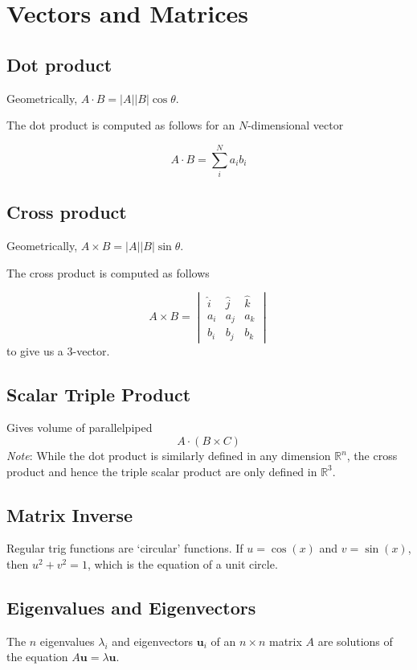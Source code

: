 
\section{Vectors and Matrices}

\subsection*{Dot product}

Geometrically, $A \cdot B = |A| |B| \cos \theta$.

The dot product is computed as follows for an $N$-dimensional vector

\begin{equation*}
  A \cdot B = \sum_{i}^{N} a_i b_i
\end{equation*}

\subsection*{Cross product}

Geometrically, $A \times B = |A| |B| \sin \theta$.

The cross product is computed as follows

\begin{equation*}
  A \times B = \begin{vmatrix} \hat{i} & \hat{j} & \hat{k} \\ a_i & a_j & a_k \\ b_i  & b_j & b_k\end{vmatrix}
\end{equation*}
to give us a 3-vector.

\subsection*{Scalar Triple Product}
Gives volume of parallelpiped
\begin{equation*}
  A \cdot (B \times C)
\end{equation*}
\textit{Note}: While the dot product is similarly defined in any dimension $\mathbb{R}^n$, the cross product and hence
the triple scalar product are only defined in $\mathbb{R}^3$.

\subsection*{Matrix Inverse}
Regular trig functions are `circular' functions. If $u = \cos(x)$ and $v = \sin(x)$, then $u^2 + v^2 = 1$, which is the equation of a unit circle.

\subsection*{Eigenvalues and Eigenvectors}

The $n$ eigenvalues $\lambda_i$ and eigenvectors $\mathbf{u}_i$ of 
an $n \times n$ matrix $A$ are solutions of the equation
$A\mathbf{u} = \lambda \mathbf{u}$.

